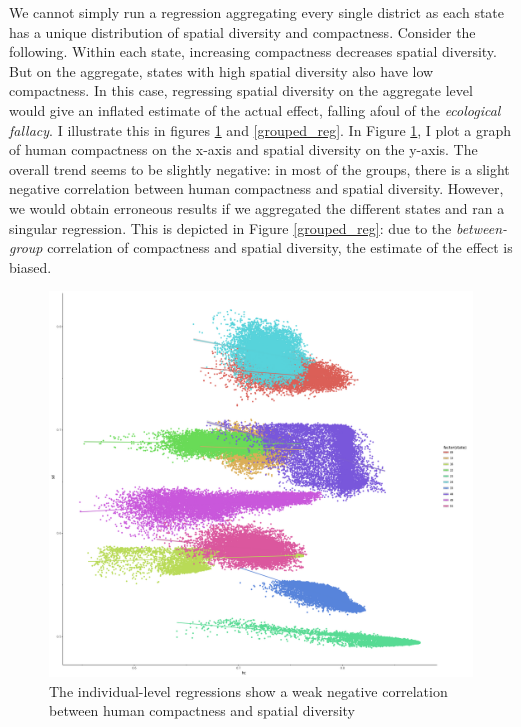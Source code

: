\documentclass[]{article}
\begin{document}
We cannot simply run a regression aggregating every single district as
each state has a unique distribution of spatial diversity and
compactness. Consider the following. Within each state, increasing
compactness decreases spatial diversity. But on the aggregate, states
with high spatial diversity also have low compactness. In this case,
regressing spatial diversity on the aggregate level would give an
inflated estimate of the actual effect, falling afoul of the
\emph{ecological fallacy}. I illustrate this in figures \ref{indiv_reg}
and \ref{grouped_reg}. In Figure \ref{indiv_reg}, I plot a graph of
human compactness on the x-axis and spatial diversity on the y-axis. The
overall trend seems to be slightly negative: in most of the groups,
there is a slight negative correlation between human compactness and
spatial diversity. However, we would obtain erroneous results if we
aggregated the different states and ran a singular regression. This is
depicted in Figure \ref{grouped_reg}: due to the \emph{between-group}
correlation of compactness and spatial diversity, the estimate of the
effect is biased.

\begin{figure}
\centering
\includegraphics{../30_results/individual_regressions.png}
\caption{The individual-level regressions show a weak negative
correlation between human compactness and spatial
diversity\label{indiv_reg}}
\end{figure}
\end{document}
